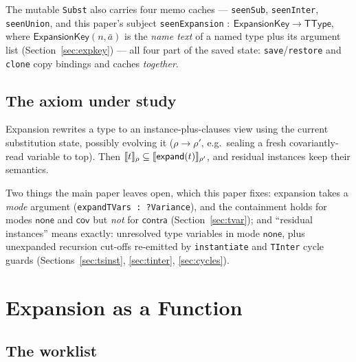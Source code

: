 \documentclass[11pt]{article}
\newcommand{\TType}{\mathsf{TType}}
\newcommand{\expandop}{\mathsf{expand}}
\newcommand{\Cov}{\mathsf{cov}}
\newcommand{\Contra}{\mathsf{contra}}
\newcommand{\NoneM}{\mathsf{none}}
\begin{document}
The mutable \texttt{Subst} also carries four memo caches —
\texttt{seenSub}, \texttt{seenInter}, \texttt{seenUnion}, and this paper's
subject \texttt{seenExpansion} $:\ \mathsf{ExpansionKey} \to \TType$,
where $\mathsf{ExpansionKey}(n, \bar{a})$ is the \emph{name text} of a
named type plus its argument list (Section~\ref{sec:expkey}) — all four
part of the saved state: \texttt{save}/\texttt{restore} and \texttt{clone}
copy bindings and caches \emph{together}.

\subsection{The axiom under study}

\begin{axiom}
\label{ax:lexp}
Expansion rewrites a type to an instance-plus-clauses view using the
current substitution state, possibly evolving it ($\rho \to \rho'$, e.g.\
sealing a fresh covariantly-read variable to top). Then
$\sem{t}_\rho \subseteq \sem{\expandop(t)}_{\rho'}$, and residual
instances keep their semantics.
\end{axiom}

Two things the main paper leaves open, which this paper fixes: expansion
takes a \emph{mode} argument (\texttt{expandTVars :\ ?Variance}), and the
containment holds for modes $\NoneM$ and $\Cov$ but \emph{not} for
$\Contra$ (Section~\ref{sec:tvar}); and ``residual instances'' means
exactly: unresolved type variables in mode $\NoneM$, plus unexpanded
recursion cut-offs re-emitted by \texttt{instantiate} and \texttt{TInter}
cycle guards (Sections~\ref{sec:tsinst}, \ref{sec:tinter},
\ref{sec:cycles}).

\section{Expansion as a Function}
\label{sec:model}

\subsection{The worklist}
\end{document}
